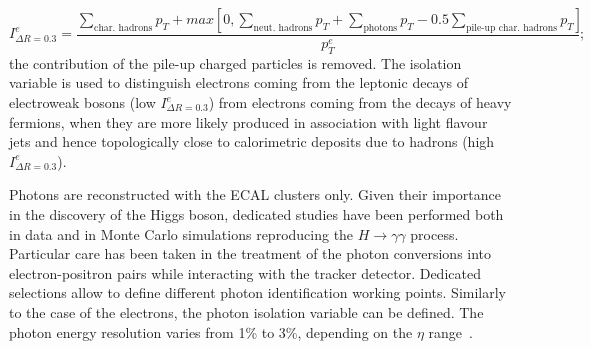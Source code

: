 \begin{equation}
I_{\Delta R = 0.3}^e = \frac{\sum_{\text{char. hadrons}} p_T + max\left[ 0, \sum_{\text{neut. hadrons}} p_T + \sum_{\text{photons}} p_T - 0.5 \sum_{\text{pile-up char. hadrons}} p_T\right]}{p_T^e};
\label{eq:electron_iso}
\end{equation}
the contribution of the pile-up charged particles is removed. The isolation variable is used to distinguish electrons coming from the leptonic decays of electroweak bosons (low $I_{\Delta R = 0.3}^e$) from electrons coming from the decays of heavy fermions, when they are more likely produced in association with light flavour jets and hence topologically close to calorimetric deposits due to hadrons (high $I_{\Delta R = 0.3}^e$).

\vspace*{1\baselineskip}

\noindent Photons are reconstructed with the ECAL clusters only. Given their importance in the discovery of the Higgs boson, dedicated studies have been performed both in data and in Monte Carlo simulations reproducing the $H \rightarrow \gamma \gamma$ process. Particular care has been taken in the treatment of the photon conversions into electron-positron pairs while interacting with the tracker detector. Dedicated selections allow to define different photon identification working points. Similarly to the case of the electrons, the photon isolation variable can be defined. The photon energy resolution varies from 1\% to 3\%, depending on the $\eta$ range~\cite{Khachatryan:2015iwa}.

